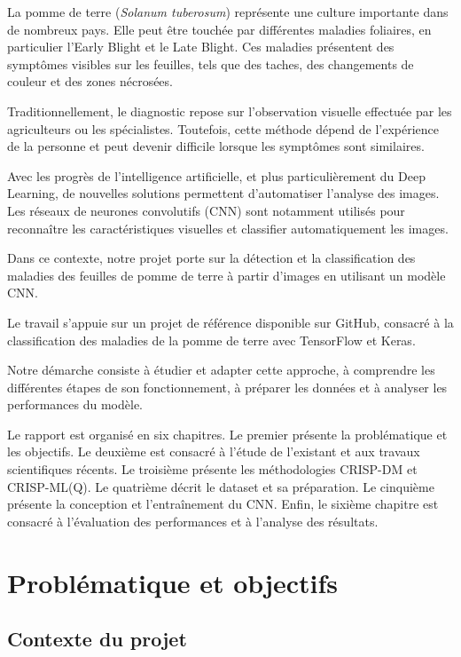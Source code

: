 \documentclass[12pt,a4paper,oneside]{report}
\begin{document}
La pomme de terre (\textit{Solanum tuberosum}) représente
une culture importante dans de nombreux pays. Elle peut
être touchée par différentes maladies foliaires, en particulier
l'Early Blight et le Late Blight. Ces maladies présentent
des symptômes visibles sur les feuilles, tels que des taches,
des changements de couleur et des zones nécrosées.

Traditionnellement, le diagnostic repose sur l'observation
visuelle effectuée par les agriculteurs ou les spécialistes.
Toutefois, cette méthode dépend de l'expérience de la personne
et peut devenir difficile lorsque les symptômes sont similaires.

Avec les progrès de l'intelligence artificielle, et plus
particulièrement du Deep Learning, de nouvelles solutions
permettent d'automatiser l'analyse des images.
Les réseaux de neurones convolutifs (CNN) sont notamment
utilisés pour reconnaître les caractéristiques visuelles
et classifier automatiquement les images.

Dans ce contexte, notre projet porte sur la détection
et la classification des maladies des feuilles de pomme
de terre à partir d'images en utilisant un modèle CNN.

Le travail s'appuie sur un projet de référence disponible
sur GitHub, consacré à la classification des maladies
de la pomme de terre avec TensorFlow et Keras.

Notre démarche consiste à étudier et adapter cette approche,
à comprendre les différentes étapes de son fonctionnement,
à préparer les données et à analyser les performances
du modèle.

Le rapport est organisé en six chapitres.
Le premier présente la problématique et les objectifs.
Le deuxième est consacré à l'étude de l'existant et aux
travaux scientifiques récents.
Le troisième présente les méthodologies CRISP-DM et
CRISP-ML(Q). Le quatrième décrit le dataset et sa préparation.
Le cinquième présente la conception et l'entraînement du CNN.
Enfin, le sixième chapitre est consacré à l'évaluation
des performances et à l'analyse des résultats.


\chapter{Problématique et objectifs}

\section{Contexte du projet}
\end{document}
